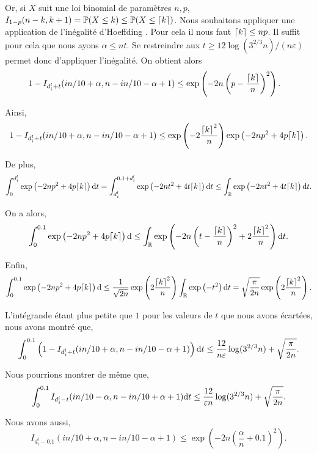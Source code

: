 Or, si \(X\) suit une loi binomial de paramètres \(n,p\), \(I_{1 - p}(n - k, k + 1)  = \mathbb P(X \leq k) \leq \mathbb P(X \leq {\lceil k \rceil})\). Nous souhaitons appliquer une application de l'inégalité d'{\sc Hoeffding} \cite{10.5555/3134214}. Pour cela il nous faut \({\lceil k \rceil} \leq np\). Il suffit pour cela que nous ayons \(\alpha \leq nt\). Se restreindre aux \(t \geq 12\log(3^{2/3}n)/(n\varepsilon)\) permet donc d'appliquer l'inégalité. On obtient alors
\begin{align*}
    1 - I_{d_i^l + t}(in/10 + \alpha, n - in/10 -  \alpha + 1) & \leq \exp\left( -2n\left( p - \dfrac{{\lceil k \rceil}}{n} \right)^2 \right).
\end{align*}

Ainsi,
\[
    1 - I_{d_i^l + t}(in/10 + \alpha, n - in/10 -  \alpha + 1) \leq \exp\left( - 2\dfrac{{\lceil k \rceil}^2}{n} \right)\exp\left( -2np^2 + 4p{\lceil k \rceil} \right).
\]

De plus,
\begin{align*}
    \int_0^{d_i^l}\exp\left( -2np^2 + 4p{\lceil k \rceil} \right)\mathrm{d} t = \int_{d_i^l}^{{0.1 + d_i^l}}\exp\left( -2nt^2 + 4t{\lceil k \rceil} \right)\mathrm{d} t \leq \int_{\mathbb{R}}\exp\left( -2nt^2 + 4t{\lceil k \rceil} \right)\mathrm{d} t.
\end{align*}

On a alors,
\[
    \int_0^{0.1}\exp\left( -2np^2 + 4p{\lceil k \rceil} \right)\mathrm{d} \leq  \int_{\mathbb{R}}\exp\left( -2n\left(t - \dfrac{{\lceil k \rceil}}{n}\right)^2 + 2 \dfrac{{\lceil k \rceil}^2}{n} \right)\mathrm{d} t.
\]

Enfin,
\[
    \int_0^{0.1}\exp\left( -2np^2 + 4p{\lceil k \rceil} \right)\mathrm{d} \leq \dfrac{1}{\sqrt{2n}}\exp\left( 2 \dfrac{{\lceil k \rceil}^2}{n} \right) \int_{\mathbb{R}}\exp\left( -t^2 \right)\mathrm{d} t = \sqrt{\dfrac{\pi}{2n}}\exp\left( 2 \dfrac{{\lceil k \rceil}^2}{n} \right).
\]

L'intégrande étant plus petite que \(1\) pour les valeurs de \(t\) que nous avons écartées, nous avons montré que,
\begin{align}
    \int_{0}^{0.1}\left( 1 - I_{d_i^l + t}(in/10 + \alpha, n - in/10 -  \alpha + 1) \right) \mathrm{d} t \leq \dfrac{12}{n\varepsilon}\log(3^{2/3}n) + \sqrt{\dfrac{\pi}{2n}}.
\end{align}

Nous pourrions montrer de même que,
\begin{align}
    \int_{0}^{0.1}I_{d_i^l - t}(in/10 - \alpha, n - in/10 +  \alpha + 1) \mathrm{d} t \leq \dfrac{12}{\varepsilon n}\log(3^{2/3}n) + \sqrt{\dfrac{\pi}{2n}}.
\end{align}

Nous avons aussi,
\[
    I_{d_i^l - 0.1}(in/10 + \alpha, n - in/10 -  \alpha + 1)  \leq \exp\left( -2n\left( \dfrac{\alpha}{n} + 0.1 \right)^2 \right).
\]

